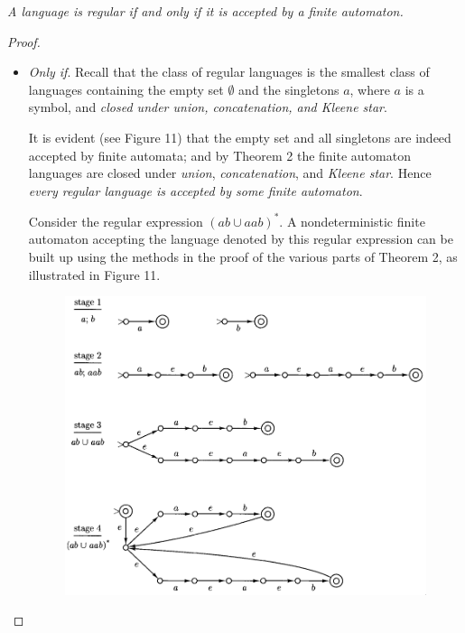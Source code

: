 \begin{theorem}{}
  \textit{A language is regular if and only if it is accepted by a finite automaton.}
\end{theorem}

\begin{proof}
  \begin{itemize}
    \item \textit{Only if}. Recall that the class of regular languages is the smallest class of languages containing the empty set $\emptyset$ and the singletons $a$, where $a$ is a symbol, and \textit{closed under union, concatenation, and Kleene star}.

    It is evident (see Figure 11) that the empty set and all singletons are indeed accepted by finite automata; and by Theorem 2 the finite automaton languages are closed under \textit{union}, \textit{concatenation}, and \textit{Kleene star}. Hence \textit{every regular language is accepted by some finite automaton}.

    \begin{example}{}
      Consider the regular expression $(ab \cup aab)^*$. A nondeterministic finite automaton accepting the language denoted by this regular expression can be built up using the methods in the proof of the various parts of Theorem 2, as illustrated in Figure 11.
    \end{example}

    \begin{figure}[h!]
      \centering
      \includegraphics[width=.95\textwidth]{img/Fig2.14.png}
      \caption{}
    \end{figure}


\end{itemize}
\end{proof}
